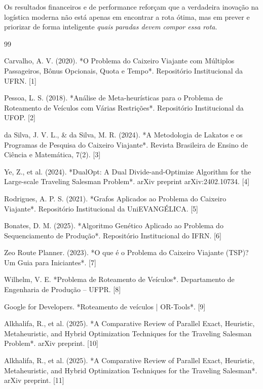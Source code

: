 \documentclass[11pt,a4paper,twocolumn]{article}
\begin{document}
Os resultados financeiros e de performance reforçam que a verdadeira inovação na logística moderna não está apenas em encontrar a rota ótima, mas em prever e priorizar de forma inteligente \textit{quais paradas devem compor essa rota}.

\begin{thebibliography}{99}

Carvalho, A. V. (2020). *O Problema do Caixeiro Viajante com Múltiplos Passageiros, Bônus Opcionais, Quota e Tempo*. Repositório Institucional da UFRN. [1]

Pessoa, L. S. (2018). *Análise de Meta-heurísticas para o Problema de Roteamento de Veículos com Várias Restrições*. Repositório Institucional da UFOP. [2]

da Silva, J. V. L., & da Silva, M. R. (2024). *A Metodologia de Lakatos e os Programas de Pesquisa do Caixeiro Viajante*. Revista Brasileira de Ensino de Ciência e Matemática, 7(2). [3]

Ye, Z., et al. (2024). *DualOpt: A Dual Divide-and-Optimize Algorithm for the Large-scale Traveling Salesman Problem*. arXiv preprint arXiv:2402.10734. [4]

Rodrigues, A. P. S. (2021). *Grafos Aplicados ao Problema do Caixeiro Viajante*. Repositório Institucional da UniEVANGÉLICA. [5]

Bonates, D. M. (2025). *Algoritmo Genético Aplicado ao Problema do Sequenciamento de Produção*. Repositório Institucional do IFRN. [6]

Zeo Route Planner. (2023). *O que é o Problema do Caixeiro Viajante (TSP)? Um Guia para Iniciantes*. [7]

Wilhelm, V. E. *Problema de Roteamento de Veículos*. Departamento de Engenharia de Produção – UFPR. [8]

Google for Developers. *Roteamento de veículos | OR-Tools*. [9]

Alkhalifa, R., et al. (2025). *A Comparative Review of Parallel Exact, Heuristic, Metaheuristic, and Hybrid Optimization Techniques for the Traveling Salesman Problem*. arXiv preprint. [10]

Alkhalifa, R., et al. (2025). *A Comparative Review of Parallel Exact, Heuristic, Metaheuristic, and Hybrid Optimization Techniques for the Traveling Salesman*. arXiv preprint. [11]


\end{thebibliography}
\end{document}
